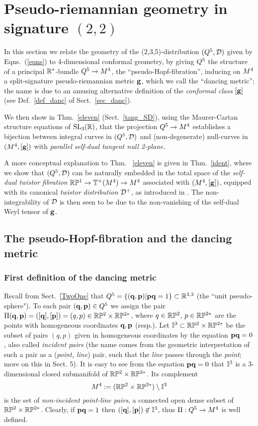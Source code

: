 \section{Pseudo-riemannian geometry in signature $(2,2)$}\label{pr}

 In this section we relate the geometry of the (2,3,5)-distribution $(Q^5, {\mathcal D})$ given by Eqns.~(\ref{eqns}) to 4-dimensional  conformal  geometry, by giving $Q^5$ the structure of a principal $\mathbb{R}^*$-bundle $Q^5\to M^4$, the  ``pseudo-Hopf-fibration'', inducing on  $M^4$  a  split-signature pseudo-riemannian metric $\mathbf{ g}$, which we call the ``dancing metric''; the  name is due to an amusing alternative  definition  of the {\em conformal class} $[\mathbf{ g}]$ (see Def.~\ref{def_danc} of Sect.~\ref{sec_danc}).


We then show in Thm.~\ref{eleven} (Sect.~\ref{tang_SD}), using the Maurer-Cartan structure equations of ${\mathrm{SL}_3(\mathbb{R})}$, that the projection $Q^5\to M^4$ establishes a bijection between  integral curves  in  $(Q^5,{\mathcal D})$   and  (non-degenerate) null-curves in $(M^4,[\mathbf{ g}])$ with  {\em parallel  self-dual tangent null 2-plane.} 

A more conceptual explanation to Thm.~ \ref{eleven} is given in Thm.~\ref{ident}, where we  show  that  $(Q^5, {\mathcal D})$ can  be naturally embedded in  the  total space of the {\em self-dual twistor fibration} $\mathbb{R}\mathbb{P}^1\to \mathbb{T}^+(M^4)\to M^4$ associated with $(M^4,[\mathbf{ g}])$, equipped with its canonical {\em twistor distribution} ${\mathcal D}^+$, as introduced in \cite{AN}. The non-integrability of ${\mathcal D}$ is then seen to be due  to the non-vanishing of the self-dual Weyl tensor of $\mathbf{ g}$.

\subsection{The pseudo-Hopf-fibration and the dancing metric} 

\subsubsection{First definition of the dancing metric}\label{first}
Recall from Sect.~\ref{TwoOne} that $Q^5=\{(\mathbf q,{\mathbf p})|{\mathbf p}\mathbf q=1\}\subset \mathbb{R}^{3,3}$ (the ``unit pseudo-sphere"). To each pair $(\mathbf q,{\mathbf p})\in Q^5$ we assign the pair $\Pi(\mathbf q, {\mathbf p})=([\mathbf q], [{\mathbf p}])=(q, p)\in \mathbb{R}\mathbb{P}^2\times\mathbb{R}\mathbb{P}^{2*}$, where  $q\in \mathbb{R}\mathbb{P}^2$, $p\in\mathbb{R}\mathbb{P}^{2*}$ are the points with homogeneous coordinates $\mathbf q, {\mathbf p}$ (resp.). Let ${\mathbb I^3}\subset\mathbb{R}\mathbb{P}^2\times\mathbb{R}\mathbb{P}^{2*}$ be the subset of pairs $(q,p)$ given in homogeneous coordinates by the equation ${\mathbf p}\mathbf q=0$, also called {\em incident pairs}  (the name comes from the geometric interpretation of such a pair  as  a ({\em point, line}) pair, such that the {\em line} passes through  the {\em point}; more on this in  Sect. 5).  It is easy to see from the equation ${\mathbf p}\mathbf q=0$ that ${\mathbb I^3}$ is a 3-dimensional  closed submanifold of $\mathbb{R}\mathbb{P}^2\times\mathbb{R}\mathbb{P}^{2*}$.  Its   complement  $$M^4:=(\mathbb{R}\mathbb{P}^2\times\mathbb{R}\mathbb{P}^{2*})\setminus {\mathbb I^3}$$ is  the set of {\em non-incident point-line pairs},   a connected  open dense  subset of $\mathbb{R}\mathbb{P}^2\times\mathbb{R}\mathbb{P}^{2*}$. Clearly, if ${\mathbf p}\mathbf q=1$ then $([\mathbf q], [{\mathbf p}])\not\in{\mathbb I^3}$, thus $\Pi:Q^5\to M^4$ is well defined. 


